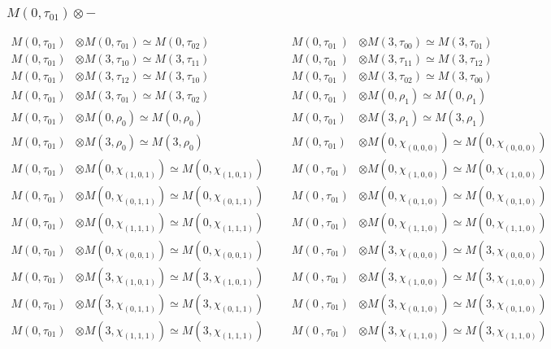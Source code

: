 \subsubsection{$M(0,\tau_{01})\otimes -$}
\begin{align*}
M(0,\tau_{01}) &\otimes M(0,\tau_{01}) \simeq M(0,\tau_{02}) &&& M(0,\tau_{01}\
) &\otimes M(3,\tau_{00}) \simeq M(3,\tau_{01})\\
M(0,\tau_{01}) &\otimes M(3,\tau_{10}) \simeq M(3,\tau_{11}) &&& M(0,\tau_{01}\
) &\otimes M(3,\tau_{11}) \simeq M(3,\tau_{12})\\
M(0,\tau_{01}) &\otimes M(3,\tau_{12}) \simeq M(3,\tau_{10}) &&& M(0,\tau_{01}\
) &\otimes M(3,\tau_{02}) \simeq M(3,\tau_{00})\\
M(0,\tau_{01}) &\otimes M(3,\tau_{01}) \simeq M(3,\tau_{02}) &&& M(0,\tau_{01}\
) &\otimes M(0,\rho_{1}) \simeq M(0,\rho_{1})\\
M(0,\tau_{01}) &\otimes M(0,\rho_{0}) \simeq M(0,\rho_{0}) &&& M(0,\tau_{01}) \
&\otimes M(3,\rho_{1}) \simeq M(3,\rho_{1})\\
M(0,\tau_{01}) &\otimes M(3,\rho_{0}) \simeq M(3,\rho_{0}) &&& M(0,\tau_{01}) \
&\otimes M(0,\chi_{(0,0,0)}) \simeq M(0,\chi_{(0,0,0)})\\
M(0,\tau_{01}) &\otimes M(0,\chi_{(1,0,1)}) \simeq M(0,\chi_{(1,0,1)}) &&& M(0\
,\tau_{01}) &\otimes M(0,\chi_{(1,0,0)}) \simeq M(0,\chi_{(1,0,0)})\\
M(0,\tau_{01}) &\otimes M(0,\chi_{(0,1,1)}) \simeq M(0,\chi_{(0,1,1)}) &&& M(0\
,\tau_{01}) &\otimes M(0,\chi_{(0,1,0)}) \simeq M(0,\chi_{(0,1,0)})\\
M(0,\tau_{01}) &\otimes M(0,\chi_{(1,1,1)}) \simeq M(0,\chi_{(1,1,1)}) &&& M(0\
,\tau_{01}) &\otimes M(0,\chi_{(1,1,0)}) \simeq M(0,\chi_{(1,1,0)})\\
M(0,\tau_{01}) &\otimes M(0,\chi_{(0,0,1)}) \simeq M(0,\chi_{(0,0,1)}) &&& M(0\
,\tau_{01}) &\otimes M(3,\chi_{(0,0,0)}) \simeq M(3,\chi_{(0,0,0)})\\
M(0,\tau_{01}) &\otimes M(3,\chi_{(1,0,1)}) \simeq M(3,\chi_{(1,0,1)}) &&& M(0\
,\tau_{01}) &\otimes M(3,\chi_{(1,0,0)}) \simeq M(3,\chi_{(1,0,0)})\\
M(0,\tau_{01}) &\otimes M(3,\chi_{(0,1,1)}) \simeq M(3,\chi_{(0,1,1)}) &&& M(0\
,\tau_{01}) &\otimes M(3,\chi_{(0,1,0)}) \simeq M(3,\chi_{(0,1,0)})\\
M(0,\tau_{01}) &\otimes M(3,\chi_{(1,1,1)}) \simeq M(3,\chi_{(1,1,1)}) &&& M(0\
,\tau_{01}) &\otimes M(3,\chi_{(1,1,0)}) \simeq M(3,\chi_{(1,1,0)})\\

\end{align*}
